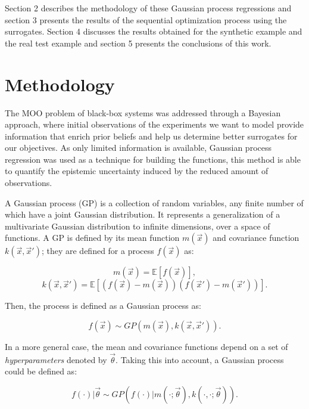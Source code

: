 \documentclass{article}
\begin{document}
Section 2 describes the methodology of these Gaussian process regressions and section 3 presents the results of the sequential optimization process using the surrogates. Section 4 discusses the results obtained for the synthetic example and the real test example and section 5 presents the conclusions of this work.

\section{Methodology}

The MOO problem of black-box systems was addressed through a Bayesian approach, where initial observations of the experiments we want to model provide information that enrich prior beliefs and help us determine better surrogates for our objectives. As only limited information is available, Gaussian process regression was used as a technique for building the functions, this method is able to quantify the epistemic uncertainty induced by the reduced amount of observations.

A Gaussian process (GP) is a collection of random variables, any finite number of which have a joint Gaussian distribution\cite{Seeger2004}. It represents a generalization of a multivariate Gaussian distribution to infinite dimensions, over a space of functions. A GP is defined by its mean function $m(\vec{x})$ and covariance function $k(\vec{x},\vec{x}')$; they are defined for a process $f(\vec{x})$ as:

\begin{equation}
    m(\vec{x}) = \mathbb{E}[f(\vec{x})],
\end{equation}
\begin{equation}
    k(\vec{x},\vec{x}') = \mathbb{E}[(f(\vec{x})-m(\vec{x}))(f(\vec{x}')-m(\vec{x}'))].
\end{equation}

Then, the process is defined as a Gaussian process as: \cite{Seeger2004}

\begin{equation}
    f(\vec{x}) \sim GP(m(\vec{x}), k(\vec{x},\vec{x}')).
\end{equation}

In a more general case, the mean and covariance functions depend on a set of \textit{hyperparameters} denoted by $\vec{\theta}$. Taking this into account, a Gaussian process could be defined as:

\begin{equation}
    f(\cdot)|\vec{\theta} \sim GP(f(\cdot)|m(\cdot;\vec{\theta}),k(\cdot,\cdot;\vec{\theta})).
\end{equation}
\end{document}
